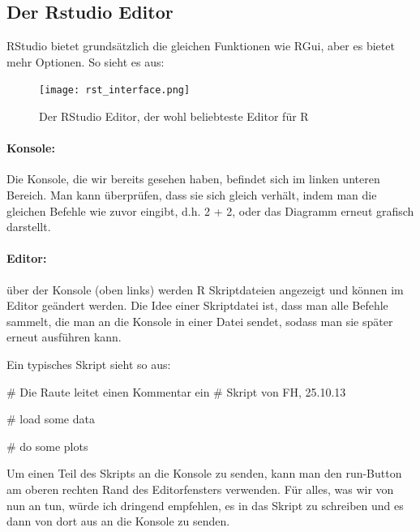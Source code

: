 \documentclass[a4paper,twoside]{tufte-book}\usepackage[]{graphicx}\usepackage[]{color}
\begin{document}
\begin{appendices}
\subsection{Der Rstudio Editor}
 
RStudio bietet grundsätzlich die gleichen Funktionen wie RGui, aber es bietet mehr Optionen. So sieht es aus:

\begin{figure}[]
\begin{center}
\texttt{[image: rst\_interface.png]}
\caption{Der RStudio Editor, der wohl beliebteste Editor für R}
\label{fig: Rstudio}
\end{center}
\end{figure}


\paragraph{Konsole:} Die Konsole, die wir bereits gesehen haben, befindet sich im linken unteren Bereich. Man kann überprüfen, dass sie sich gleich verhält, indem man die gleichen Befehle wie zuvor eingibt, d.h. 2 + 2, oder das Diagramm erneut grafisch darstellt.

\paragraph{Editor:} über der Konsole (oben links) werden R Skriptdateien angezeigt und können im Editor geändert werden. Die Idee einer Skriptdatei ist, dass man alle Befehle sammelt, die man an die Konsole in einer Datei sendet, sodass man sie später erneut ausführen kann.  

Ein typisches Skript sieht so aus:


\begin{Schunk}
\begin{Sinput}
# Die Raute leitet einen Kommentar ein
# Skript von FH, 25.10.13

# load some data

# do some plots
\end{Sinput}
\end{Schunk}

Um einen Teil des Skripts an die Konsole zu senden, kann man den run-Button am oberen rechten Rand des Editorfensters verwenden. Für alles, was wir von nun an tun, würde ich dringend empfehlen, es in das Skript zu schreiben und es dann von dort aus an die Konsole zu senden.


\end{appendices}
\end{document}
